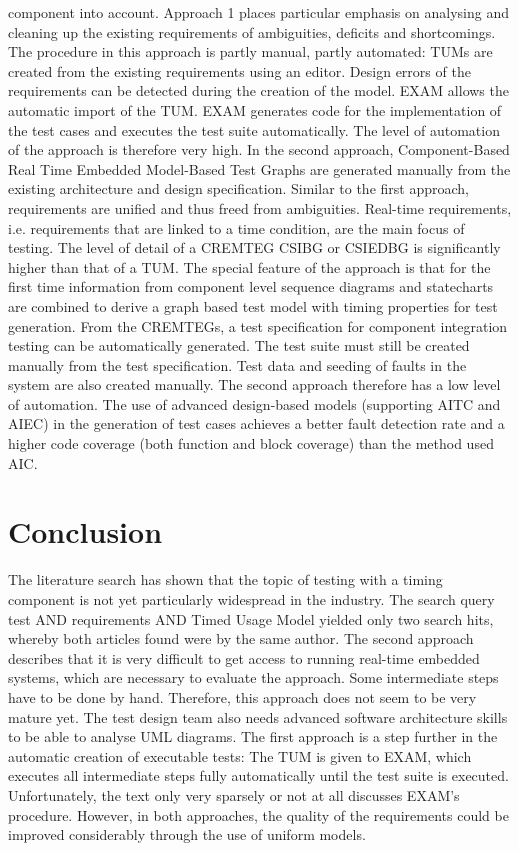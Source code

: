 component into account. Approach 1 places particular emphasis on analysing
and \textquotedbl cleaning up\textquotedbl{} the existing requirements
of ambiguities, deficits and shortcomings. The procedure in this approach
is partly manual, partly automated: TUMs are created from the existing
requirements using an editor. Design errors of the requirements can
be detected during the creation of the model. EXAM allows the automatic
import of the TUM. EXAM generates code for the implementation of the
test cases and executes the test suite automatically. The level of
automation of the approach is therefore very high. In the second approach,
Component-Based Real Time Embedded Model-Based Test Graphs are generated
manually from the existing architecture and design specification.
Similar to the first approach, requirements are unified and thus freed
from ambiguities. Real-time requirements, i.e. requirements that are
linked to a time condition, are the main focus of testing. The level
of detail of a CREMTEG CSIBG or CSIEDBG is significantly higher than
that of a TUM. The special feature of the approach is that for the
first time information from component level sequence diagrams and
statecharts are combined to derive a graph based test model with timing
properties for test generation. From the CREMTEGs, a test specification
for component integration testing can be automatically generated.
The test suite must still be created manually from the test specification.
Test data and seeding of faults in the system are also created manually.
The second approach therefore has a low level of automation. The use
of advanced design-based models (supporting AITC and AIEC) in the
generation of test cases achieves a better fault detection rate and
a higher code coverage (both function and block coverage) than the
method used AIC.

\section{Conclusion\label{sec:Conclusion}}

The literature search has shown that the topic of \textquotedbl testing
with a timing component\textquotedbl{} is not yet particularly widespread
in the industry. The search query \textquotedbl test AND requirements
AND \textquotedbl Timed Usage Model\textquotedbl{} yielded only two
search hits, whereby both articles found were by the same author.
The second approach describes that it is very difficult to get access
to running real-time embedded systems, which are necessary to evaluate
the approach. Some intermediate steps have to be done by hand. Therefore,
this approach does not seem to be very mature yet. The test design
team also needs advanced software architecture skills to be able to
analyse UML diagrams. The first approach is a step further in the
automatic creation of executable tests: The TUM is given to EXAM,
which executes all intermediate steps fully automatically until the
test suite is executed. Unfortunately, the text only very sparsely
or not at all discusses EXAM's procedure. However, in both approaches,
the quality of the requirements could be improved considerably through
the use of uniform models.\\
\nocite{*}



